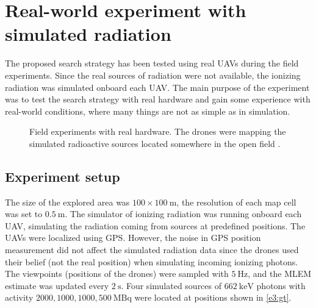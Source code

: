 \section{Real-world experiment with simulated radiation\label{chap:exp3}}
The proposed search strategy has been tested using real \ac{UAV}s during the field experiments.
Since the real sources of radiation were not available, the ionizing radiation was simulated onboard each \ac{UAV}.
The main purpose of the experiment was to test the search strategy with real hardware and gain some experience with real-world conditions, where many things are not as simple as in simulation.
\begin{figure}[!htb]
  \centering
  \caption{Field experiments with real hardware. The drones \protect{} were mapping the simulated radioactive sources located somewhere in the open field \protect{}.}
  \label{fig:}
\end{figure}
\subsection{Experiment setup}
The size of the explored area was $100 \times 100\ \si{\meter}$, the resolution of each map cell was set to $\SI{0.5}{\meter}$.
The simulator of ionizing radiation was running onboard each \ac{UAV}, simulating the radiation coming from sources at predefined positions.
The \ac{UAV}s were localized using \ac{GPS}.
However, the noise in \ac{GPS} position measurement did not affect the simulated radiation data since the drones used their belief (not the real position) when simulating incoming ionizing photons.
The viewpoints (positions of the drones) were sampled with $\SI{5}{\hertz}$, and the \ac{MLEM} estimate was updated every $\SI{2}{\second}$.
Four simulated sources of $\SI{662}{\kilo\electronvolt}$ photons with activity $2000, 1000, 1000, 500\ \si{\mega\becquerel}$ were located at positions shown in  \autoref{e3:gt}.

